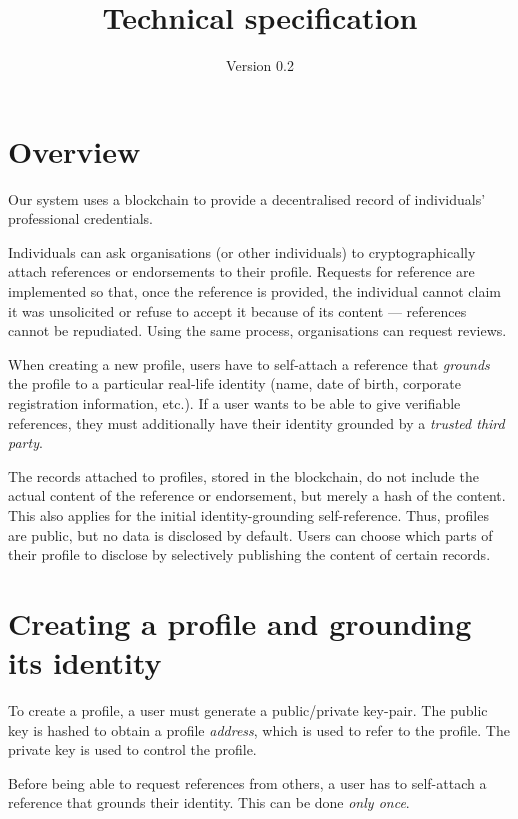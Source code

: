 \documentclass[a4paper, bibliography=totoc, titlepage=false]{scrartcl}
\title{Technical specification}
\subtitle{Version 0.2}
\date{}
\begin{document}
\maketitle

\section{Overview}

Our system uses a blockchain to provide a decentralised record of individuals' professional credentials.

Individuals can ask organisations (or other individuals) to cryptographically attach references or endorsements to their profile. Requests for reference are implemented so that, once the reference is provided, the individual cannot claim it was unsolicited or refuse to accept it because of its content --- references cannot be repudiated. Using the same process, organisations can request reviews.

When creating a new profile, users have to self-attach a reference that \emph{grounds} the profile to a particular real-life identity (name, date of birth, corporate registration information, etc.). If a user wants to be able to give verifiable references, they must additionally have their identity grounded by a \emph{trusted third party}.

The records attached to profiles, stored in the blockchain, do not include the actual content of the reference or endorsement,  but merely a hash of the content. This also applies for the initial identity-grounding self-reference. Thus, profiles are public, but no data is disclosed by default. Users can choose which parts of their profile to disclose by selectively publishing the content of certain records.


\section{Creating a profile and grounding its identity}

To create a profile, a user must generate a public/private key-pair. The public key is hashed to obtain a profile \emph{address}, which is used to refer to the profile. The private key is used to control the profile.

Before being able to request references from others, a user has to self-attach a reference that grounds their identity. This can be done \emph{only once}.
\end{document}

